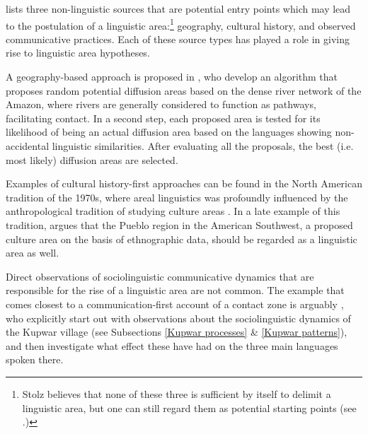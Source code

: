 \documentclass[output=paper]{langscibook}
\begin{document}
\noindent \textcite{Stolz2006All} lists three non-linguistic sources that are potential entry points which may lead to the postulation of a linguistic area:\footnote{Stolz believes that none of these three is sufficient by itself to delimit a linguistic area, but one can still regard them as potential starting points (see \citealt{GijnForthcSeparating}.)} geography, cultural history, and observed communicative practices. Each of these source types has played a role in giving rise to linguistic area hypotheses. 

A geography-based approach is proposed in \textcite{Ranacheretal2017identifying}, who develop an algorithm that proposes random potential diffusion areas based on the dense river network of the Amazon, where rivers are generally considered to function as pathways, facilitating contact. In a second step, each proposed area is tested for its likelihood of being an actual diffusion area based on the languages showing non-accidental linguistic similarities. After evaluating all the proposals, the best (i.e. most likely) diffusion areas are selected. 

Examples of cultural history-first approaches can be found in the North American tradition of the 1970s, where areal linguistics was profoundly influenced by the anthropological tradition of studying culture areas \parencite{mithun2017native}. In a late example of this tradition, \textcite{Bereznak1995Pueblo} argues that the Pueblo region in the American Southwest, a proposed culture area on the basis of ethnographic data, should be regarded as a linguistic area as well.

Direct observations of sociolinguistic communicative dynamics that are responsible for the rise of a linguistic area are not common. The example that comes closest to a communication-first account of a contact zone is arguably \textcite{gumperzetal1971convergence}, who explicitly start out with observations about the sociolinguistic dynamics of the Kupwar village (see Subsections \ref{Kupwar processes} \& \ref{Kupwar patterns}), and then investigate what effect these have had on the three main languages spoken there.
\end{document}
